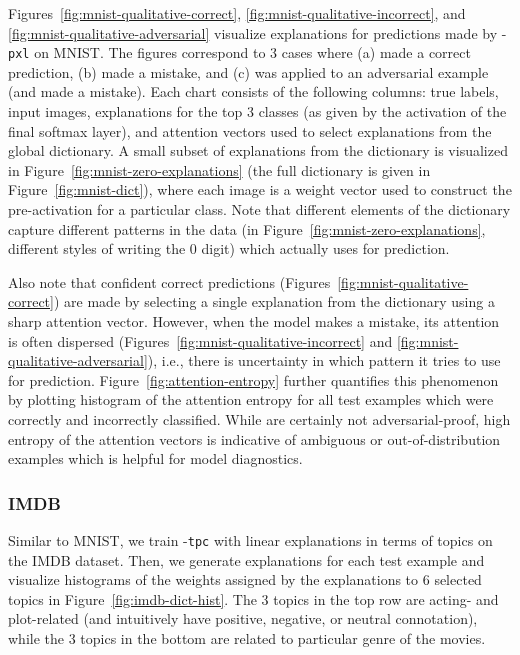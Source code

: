 \documentclass[twoside,11pt]{article}
\begin{document}
Figures~\ref{fig:mnist-qualitative-correct}, \ref{fig:mnist-qualitative-incorrect}, and \ref{fig:mnist-qualitative-adversarial} visualize explanations for predictions made by {\CEN}-\texttt{pxl} on MNIST.
The figures correspond to 3 cases where {\CEN} (a) made a correct prediction, (b) made a mistake, and (c) was applied to an adversarial example (and made a mistake).
Each chart consists of the following columns: true labels, input images, explanations for the top 3 classes (as given by the activation of the final softmax layer), and attention vectors used to select explanations from the global dictionary.
A small subset of explanations from the dictionary is visualized in Figure~\ref{fig:mnist-zero-explanations} (the full dictionary is given in Figure~\ref{fig:mnist-dict}), where each image is a weight vector used to construct the pre-activation for a particular class.
Note that different elements of the dictionary capture different patterns in the data (in Figure~\ref{fig:mnist-zero-explanations}, different styles of writing the 0 digit) which {\CEN} actually uses for prediction.

Also note that confident correct predictions (Figures~\ref{fig:mnist-qualitative-correct}) are made by selecting a single explanation from the dictionary using a sharp attention vector.
However, when the model makes a mistake, its attention is often dispersed (Figures~\ref{fig:mnist-qualitative-incorrect} and \ref{fig:mnist-qualitative-adversarial}), i.e., there is uncertainty in which pattern it tries to use for prediction.
Figure~\ref{fig:attention-entropy} further quantifies this phenomenon by plotting histogram of the attention entropy for all test examples which were correctly and incorrectly classified.
While {\CENs} are certainly not adversarial-proof, high entropy of the attention vectors is indicative of ambiguous or out-of-distribution examples which is helpful for model diagnostics.


\subsubsection{IMDB}

Similar to MNIST, we train {\CEN}-\texttt{tpc} with linear explanations in terms of topics on the IMDB dataset.
Then, we generate explanations for each test example and visualize histograms of the weights assigned by the explanations to 6 selected topics in Figure~\ref{fig:imdb-dict-hist}.
The 3 topics in the top row are acting- and plot-related (and intuitively have positive, negative, or neutral connotation), while the 3 topics in the bottom are related to particular genre of the movies.
\end{document}
